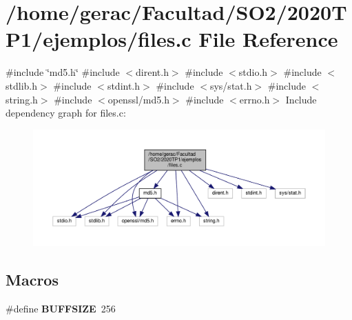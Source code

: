 \section{/home/gerac/\+Facultad/\+S\+O2/2020\+T\+P1/ejemplos/files.c File Reference}
\label{files_8c}
{\ttfamily \#include \char`\"{}md5.\+h\char`\"{}}\newline
{\ttfamily \#include $<$dirent.\+h$>$}\newline
{\ttfamily \#include $<$stdio.\+h$>$}\newline
{\ttfamily \#include $<$stdlib.\+h$>$}\newline
{\ttfamily \#include $<$stdint.\+h$>$}\newline
{\ttfamily \#include $<$sys/stat.\+h$>$}\newline
{\ttfamily \#include $<$string.\+h$>$}\newline
{\ttfamily \#include $<$openssl/md5.\+h$>$}\newline
{\ttfamily \#include $<$errno.\+h$>$}\newline
Include dependency graph for files.\+c\+:\nopagebreak
\begin{figure}[H]
\begin{center}
\leavevmode
\includegraphics[width=350pt]{files_8c__incl}
\end{center}
\end{figure}
\subsection*{Macros}
\begin{DoxyCompactItemize}
\item 
\#define \textbf{ B\+U\+F\+F\+S\+I\+ZE}~256
\end{DoxyCompactItemize}
